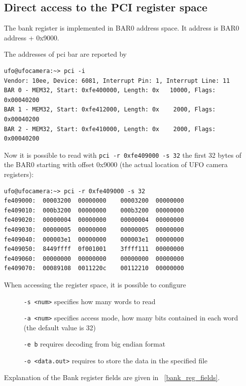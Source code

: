 \subsection{Direct access to the PCI register space}

The bank register is implemented in BAR0 address space. It address is BAR0 address + 0x9000. 

The addresses of pci bar are reported by 
\begin{verbatim}
ufo@ufocamera:~> pci -i
Vendor: 10ee, Device: 6081, Interrupt Pin: 1, Interrupt Line: 11
BAR 0 - MEM32, Start: 0xfe400000, Length: 0x   10000, Flags: 0x00040200
BAR 1 - MEM32, Start: 0xfe412000, Length: 0x    2000, Flags: 0x00040200
BAR 2 - MEM32, Start: 0xfe410000, Length: 0x    2000, Flags: 0x00040200
\end{verbatim}

Now it is possible to read with \verb/pci -r 0xfe409000 -s 32/ the first 32 bytes of the BAR0 starting with offset 0x9000 (the actual location of UFO camera registers):
\begin{verbatim}
ufo@ufocamera:~> pci -r 0xfe409000 -s 32
fe409000:  00003200  00000000    00003200  00000000
fe409010:  000b3200  00000000    000b3200  00000000
fe409020:  00000004  00000000    00000004  00000000
fe409030:  00000005  00000000    00000005  00000000
fe409040:  000003e1  00000000    000003e1  00000000
fe409050:  8449ffff  0f001001    3ffff111  00000000
fe409060:  00000000  00000000    00000000  00000000
fe409070:  00089108  0011220c    00112210  00000000
\end{verbatim}

When accessing the register space, it is possible to configure
\begin{description}
\item[ ] \verb/-s <num>/ specifies how many words to read
\item[ ] \verb/-a <num>/ specifies access mode, how many bits contained in each word (the default value is 32)
\item[ ] \verb/-e b/ requires decoding from big endian format
\item[ ] \verb/-o <data.out>/ requires to store the data in the specified file
\end{description}

Explanation of the Bank register fields are given in \tablename~\ref{bank_reg_fields}.

